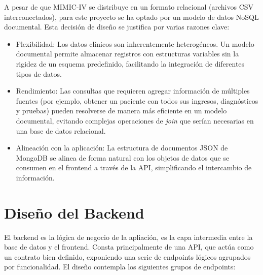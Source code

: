 A pesar de que MIMIC-IV se distribuye en un formato relacional (archivos CSV interconectados), para este proyecto se ha optado por un modelo de datos NoSQL documental. Esta decisión de diseño se justifica por varias razones clave:

\begin{itemize}
    \item Flexibilidad: Los datos clínicos son inherentemente heterogéneos. Un modelo documental permite almacenar registros con estructuras variables sin la rigidez de un esquema predefinido, facilitando la integración de diferentes tipos de datos.
    \item Rendimiento: Las consultas que requieren agregar información de múltiples fuentes (por ejemplo, obtener un paciente con todos sus ingresos, diagnósticos y pruebas) pueden resolverse de manera más eficiente en un modelo documental, evitando complejas operaciones de \textit{join} que serían necesarias en una base de datos relacional.
    \item Alineación con la aplicación: La estructura de documentos JSON de MongoDB se alinea de forma natural con los objetos de datos que se consumen en el frontend a través de la API, simplificando el intercambio de información.
\end{itemize}

\section{Diseño del Backend}




El backend es la lógica de negocio de la apliación, es la capa intermedia entre la base de datos y el frontend. Consta principalmente de una API, que actúa como un contrato bien definido, exponiendo una serie de endpoints lógicos agrupados por funcionalidad. El diseño contempla los siguientes grupos de endpoints:

